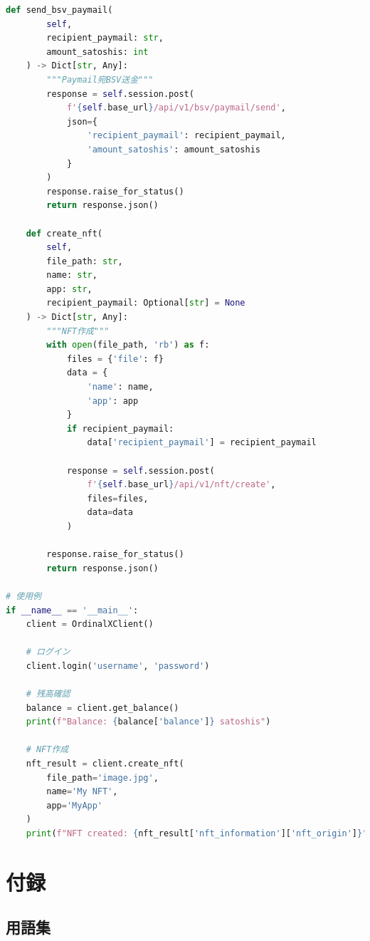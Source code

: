 \documentclass[11pt,a4paper]{ltjsarticle}  %
\begin{document}
\begin{lstlisting}[language=python, caption=Python実装]
    def send_bsv_paymail(
        self,
        recipient_paymail: str,
        amount_satoshis: int
    ) -> Dict[str, Any]:
        """Paymail宛BSV送金"""
        response = self.session.post(
            f'{self.base_url}/api/v1/bsv/paymail/send',
            json={
                'recipient_paymail': recipient_paymail,
                'amount_satoshis': amount_satoshis
            }
        )
        response.raise_for_status()
        return response.json()
    
    def create_nft(
        self,
        file_path: str,
        name: str,
        app: str,
        recipient_paymail: Optional[str] = None
    ) -> Dict[str, Any]:
        """NFT作成"""
        with open(file_path, 'rb') as f:
            files = {'file': f}
            data = {
                'name': name,
                'app': app
            }
            if recipient_paymail:
                data['recipient_paymail'] = recipient_paymail
            
            response = self.session.post(
                f'{self.base_url}/api/v1/nft/create',
                files=files,
                data=data
            )
        
        response.raise_for_status()
        return response.json()

# 使用例
if __name__ == '__main__':
    client = OrdinalXClient()
    
    # ログイン
    client.login('username', 'password')
    
    # 残高確認
    balance = client.get_balance()
    print(f"Balance: {balance['balance']} satoshis")
    
    # NFT作成
    nft_result = client.create_nft(
        file_path='image.jpg',
        name='My NFT',
        app='MyApp'
    )
    print(f"NFT created: {nft_result['nft_information']['nft_origin']}")
\end{lstlisting}

\section{付録}

\subsection{用語集}
\end{document}
